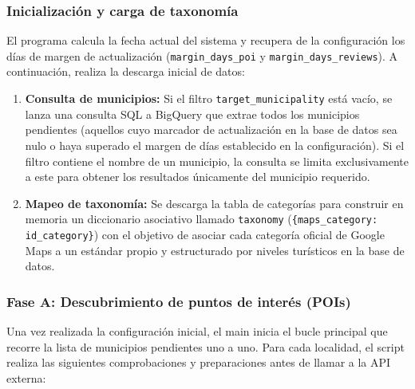 \subsubsection{Inicialización y carga de taxonomía}
El programa calcula la fecha actual del sistema y recupera de la configuración los días de margen de actualización (\texttt{margin\_days\_poi} y \texttt{margin\_days\-\_reviews}). A continuación, realiza la descarga inicial de datos:
\begin{enumerate}
    \item \textbf{Consulta de municipios:} Si el filtro \texttt{target\_municipality} está vacío, se lanza una consulta SQL a BigQuery que extrae todos los municipios pendientes (aquellos cuyo marcador de actualización en la base de datos sea nulo o haya superado el margen de días establecido en la configuración). Si el filtro contiene el nombre de un municipio, la consulta se limita exclusivamente a este para obtener los resultados únicamente del municipio requerido.
    \item \textbf{Mapeo de taxonomía:} Se descarga la tabla de categorías para construir en memoria un diccionario asociativo llamado \texttt{taxonomy} (\texttt{\{maps\_category: id\_category\}}) con el objetivo de asociar cada categoría oficial de Google Maps a un estándar propio y estructurado por niveles turísticos en la base de datos.
\end{enumerate}


\subsubsection{Fase A: Descubrimiento de puntos de interés (POIs)}
Una vez realizada la configuración inicial, el main inicia el bucle principal que recorre la lista de municipios pendientes uno a uno. Para cada localidad, el script realiza las siguientes comprobaciones y preparaciones antes de llamar a la API externa:

